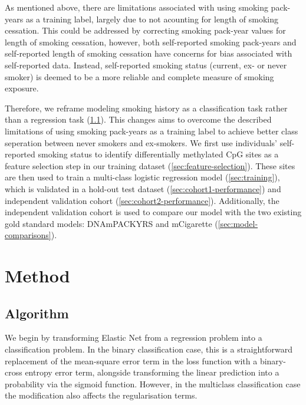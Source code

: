 \documentclass{article}
\begin{document}
As mentioned above, there are limitations associated with using smoking pack-years as a training label, largely due to not acounting for length of smoking cessation. This could be addressed by correcting smoking pack-year values for length of smoking cessation, however, both self-reported smoking pack-years and self-reported length of smoking cessation have concerns for bias associated with self-reported data. Instead, self-reported smoking status (current, ex- or never smoker) is deemed to be a more reliable and complete measure of smoking exposure.

Therefore, we reframe modeling smoking history as a classification task rather than a regression task (\ref{sec:algorithm}). This changes aims to overcome the described limitations of using smoking pack-years as a training label to achieve better class seperation between never smokers and ex-smokers. We first use individuals' self-reported smoking status to identify differentially methylated CpG sites as a feature selection step in our training dataset (\ref{sec:feature-selection}). These sites are then used to train a multi-class logistic regression model (\ref{sec:training}), which is validated in a hold-out test dataset (\ref{sec:cohort1-performance}) and independent validation cohort (\ref{sec:cohort2-performance}). Additionally, the independent validation cohort is used to compare our model with the two existing gold standard models: DNAmPACKYRS and mCigarette (\ref{sec:model-comparisons}).

\section{Method}

\subsection{Algorithm} \label{sec:algorithm}
We begin by transforming Elastic Net from a regression problem into a classification problem. In the binary classification case, this is a straightforward replacement of the mean-square error term in the loss function with a binary-cross entropy error term, alongside transforming the linear prediction into a probability via the sigmoid function. However, in the multiclass classification case the modification also affects the regularisation terms.
\end{document}
